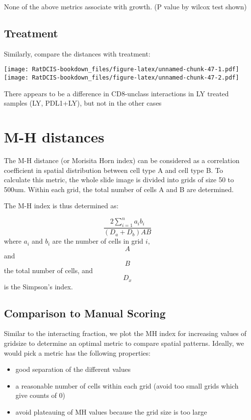 \documentclass[
]{book}
\providecommand{\tightlist}{%
  \setlength{\itemsep}{0pt}\setlength{\parskip}{0pt}}
\begin{document}
None of the above metrics associate with growth. (P value by wilcox test shown)

\hypertarget{treatment}{%
\subsection{Treatment}\label{treatment}}

Similarly, compare the distances with treatment:

\texttt{[image: RatDCIS-bookdown\_files/figure-latex/unnamed-chunk-47-1.pdf]} \texttt{[image: RatDCIS-bookdown\_files/figure-latex/unnamed-chunk-47-2.pdf]}

There appears to be a difference in CD8-unclass interactions in LY treated samples (LY, PDL1+LY), but not in the other cases

\hypertarget{m-h-distances}{%
\section{M-H distances}\label{m-h-distances}}

The M-H distance (or Morisita Horn index) can be considered as a correlation coefficient in spatial distribution between cell type A and cell type B. To calculate this metric, the whole slide image is divided into grids of size 50 to 500um. Within each grid, the total number of cells A and B are determined.

The M-H index is thus determined as:

\[ \frac{2\sum_{i=1}^n a_ib_i}{(D_a+D_b)AB} \]
where \(a_i\) and \(b_i\) are the number of cells in grid \(i\), \[A\] and \[B\] the total number of cells, and \[D_x\] is the Simpson's index.

\hypertarget{comparison-to-manual-scoring}{%
\subsection{Comparison to Manual Scoring}\label{comparison-to-manual-scoring}}

Similar to the interacting fraction, we plot the MH index for increasing values of gridsize to determine an optimal metric to compare spatial patterns. Ideally, we would pick a metric has the following properties:

\begin{itemize}
\tightlist
\item
  good separation of the different values
\item
  a reasonable number of cells within each grid (avoid too small grids which give counts of 0)
\item
  avoid plateauing of MH values because the grid size is too large
\end{itemize}
\end{document}
